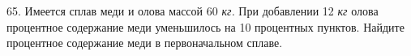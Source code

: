 65. Имеется сплав меди и олова массой 60 {\it кг.} При добавлении 12 {\it кг} олова процентное содержание меди уменьшилось на 10 процентных пунктов. Найдите процентное содержание меди в первоначальном сплаве.\\

